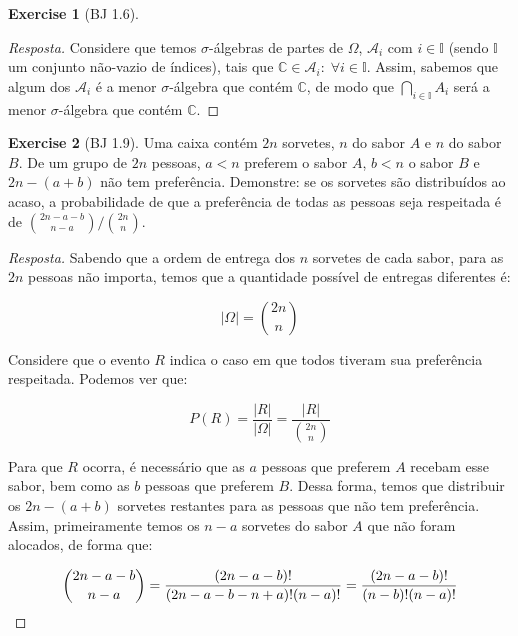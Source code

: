 \documentclass[
]{article}
\theoremstyle{definition}
\theoremstyle{definition}
\theoremstyle{definition}
\newtheorem{exercise}{Exercise}[section]
\theoremstyle{definition}
\theoremstyle{remark}
\begin{document}
\begin{exercise}[BJ 1.6]
\begin{proof}[Resposta]
Considere que temos \(\sigma\)-álgebras de partes de \(\Omega\), \(\mathcal{A}_{i}\) com \(i \in \mathbb{I}\) (sendo \(\mathbb{I}\) um conjunto não-vazio de índices), tais que \(\mathbb{C} \in \mathcal{A}_{i}: \; \forall i \in \mathbb{I}\). Assim, sabemos que algum dos \(\mathcal{A}_{i}\) é a menor \(\sigma\)-álgebra que contém \(\mathbb{C}\), de modo que \(\bigcap_{i \in \mathbb{I}}A_{i}\) será a menor \(\sigma\)-álgebra que contém \(\mathbb{C}\).
\end{proof}

\end{exercise}

\begin{exercise}[BJ 1.9]

Uma caixa contém \(2n\) sorvetes, \(n\) do sabor \(A\) e \(n\) do sabor \(B\). De um grupo de \(2n\) pessoas, \(a < n\) preferem o sabor \(A\), \(b < n\) o sabor \(B\) e \(2n-(a+b)\) não tem preferência. Demonstre: se os sorvetes são distribuídos ao acaso, a probabilidade de que a preferência de todas as pessoas seja respeitada é de \(\binom{2n-a-b}{n-a}/\binom{2n}{n}\).

\begin{proof}[Resposta]
Sabendo que a ordem de entrega dos \(n\) sorvetes de cada sabor, para as \(2n\) pessoas não importa, temos que a quantidade possível de entregas diferentes é:

\begin{equation*}
|\Omega| = \binom{2n}{n}
\end{equation*}

Considere que o evento \(R\) indica o caso em que todos tiveram sua preferência respeitada. Podemos ver que:

\begin{equation*}
P(R) = \frac{|R|}{|\Omega|} = \frac{|R|}{\binom{2n}{n}}
\end{equation*}

Para que \(R\) ocorra, é necessário que as \(a\) pessoas que preferem \(A\) recebam esse sabor, bem como as \(b\) pessoas que preferem \(B\). Dessa forma, temos que distribuir os \(2n-(a+b)\) sorvetes restantes para as pessoas que não tem preferência. Assim, primeiramente temos os \(n-a\) sorvetes do sabor \(A\) que não foram alocados, de forma que:

\begin{equation}
\binom{2n-a-b}{n-a} = \frac{(2n-a-b)!}{(2n-a-b-n+a)!(n-a)!} = \frac{(2n-a-b)!}{(n-b)!(n-a)!}\\
\label{eq:aloca}
\end{equation}


\end{proof}
\end{exercise}
\end{document}
